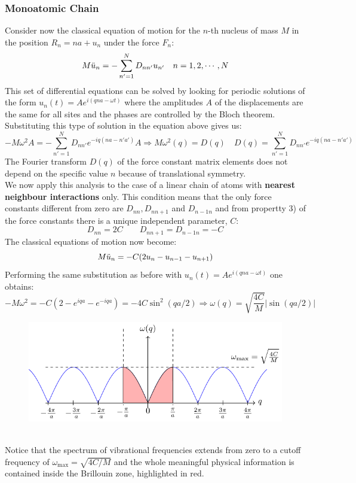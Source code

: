 \documentclass[10.75pt,a4paper,openright,bottom=2cm]{article}
\begin{document}
\subsubsection{Monoatomic Chain}
Consider now the classical equation of motion for the $n$-th nucleus of mass $M$ in the position $R_n=na+u_n$ under the force $F_n$:
\[
M\Ddot{u}_n=-\sum_{n'=1}^ND_{nn'}u_{n'} \quad n=1,2,\cdots,N
\]
This set of differential equations can be solved by looking for periodic solutions of the form $u_n(t)=Ae^{i(qna-\omega t)}$ where the amplitudes $A$ of the displacements are the same for all sites and the phases are controlled by the Bloch theorem. Substituting this type of solution in the equation above gives us:
\[
-M\omega^2A=-\sum_{n'=1}^ND_{nn'}e^{-iq(na-n'a')}A\Rightarrow M\omega^2(q)=D(q) \quad D(q)=\sum_{n'=1}^ND_{nn'}e^{-iq(na-n'a')}
\]
The Fourier transform $D(q)$ of the force constant matrix elements does not depend on the specific value $n$ because of translational symmetry.\\
We now apply this analysis to the case of a linear chain of atoms with \textbf{nearest neighbour interactions} only. This condition means that the only force constants different from zero are $D_{nn}, D_{nn+1}$ and $D_{n-1n}$ and from propertty 3) of the force constants there is a unique independent parameter, $C$:
\[
D_{nn}=2C \qquad D_{nn+1}=D_{n-1n}=-C
\]
The classical equations of motion now become:
\[
M\Ddot{u}_n=-C(2u_n-u_{n-1}-u_{n+1})
\]
Performing the same substitution as before with $u_n(t)=Ae^{i(qna-\omega t)}$ one obtains:
\[
-M\omega^2=-C(2-e^{iqa}-e^{-iqa})=-4C\sin^2(qa/2)\Rightarrow\omega(q)=\sqrt{\frac{4C}{M}}|\sin(qa/2)|
\]
\begin{figure}[h]
    \centering
    \includegraphics{omega(q).pdf}
    \label{fig:omega(q)}
\end{figure}\\
\noindent 
Notice that the spectrum of vibrational frequencies extends from zero to a cutoff frequency of $\omega_{\max}=\sqrt{4C/M}$ and the whole meaningful physical information is contained inside the  Brillouin zone, highlighted in red.\\
\end{document}
